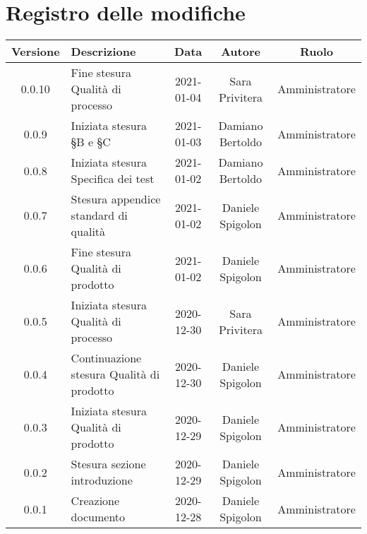 \section*{Registro delle modifiche}

\begin{center}
	\begin{longtable}{|c|p{5cm}|c|c|c|}
	\hline
	\rowcolor{lighter-grayer}
	\textbf{Versione} & \textbf{Descrizione} & \textbf{Data} & \textbf{Autore} & \textbf{Ruolo} \\
	\hline
	\endfirsthead

	\hline
	0.0.10 & Fine stesura Qualità di processo & 2021-01-04 & Sara Privitera & Amministratore \\
	\hline
	0.0.9 & Iniziata stesura §B e §C & 2021-01-03 & Damiano Bertoldo & Amministratore \\
	\hline
	0.0.8 & Iniziata stesura Specifica dei test & 2021-01-02 & Damiano Bertoldo & Amministratore \\
	\hline
	0.0.7 & Stesura appendice standard di qualità & 2021-01-02 & Daniele Spigolon & Amministratore \\
	\hline
	0.0.6 & Fine stesura Qualità di prodotto & 2021-01-02 & Daniele Spigolon & Amministratore \\
	\hline
	0.0.5 & Iniziata stesura Qualità di processo & 2020-12-30 & Sara Privitera & Amministratore \\
	\hline
	0.0.4 & Continuazione stesura Qualità di prodotto & 2020-12-30 & Daniele Spigolon & Amministratore \\
	\hline
	0.0.3 & Iniziata stesura Qualità di prodotto & 2020-12-29 & Daniele Spigolon & Amministratore \\
	\hline
	0.0.2 & Stesura sezione introduzione & 2020-12-29 & Daniele Spigolon & Amministratore \\
	\hline
	0.0.1 & Creazione documento & 2020-12-28 & Daniele Spigolon & Amministratore \\
	\hline

	\end{longtable}
\end{center}